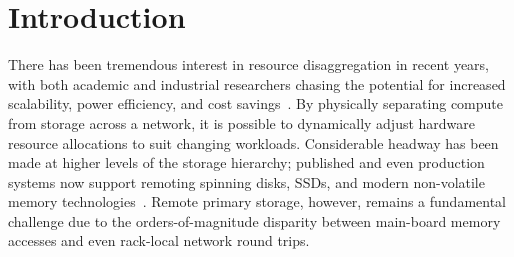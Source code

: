 \section{Introduction}

There has been tremendous interest in resource disaggregation in
recent years, with both academic and industrial researchers chasing
the potential for increased scalability, power efficiency, and cost
savings~\cite{blade-server,fastswap,rethinking,the-machine,requirements,clio-arxiv,firebox,leap,zombieland,storm,aifm,legoos,supernic}.
By physically separating compute from storage across a network, it is
possible to dynamically adjust hardware resource allocations to suit
changing workloads.  Considerable headway has been made at higher
levels of the storage hierarchy; published and even production systems
now support remoting spinning disks, SSDs, and modern non-volatile
memory technologies~\cite{decible}.  Remote primary storage, however,
remains a fundamental challenge due to the orders-of-magnitude
disparity between main-board memory accesses and even rack-local
network round trips.



